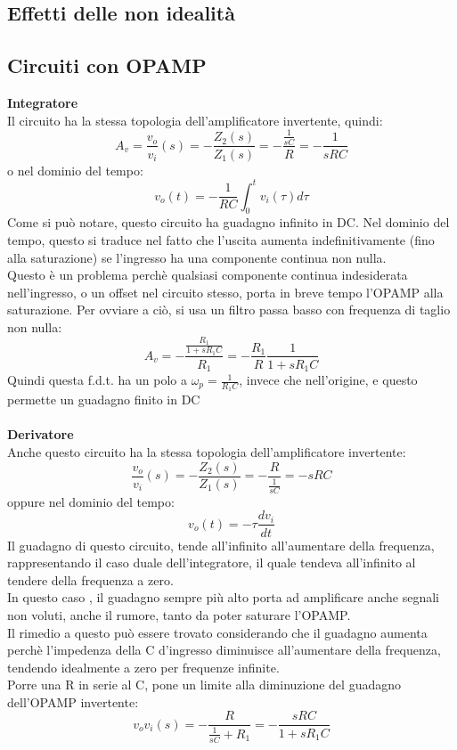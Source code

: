 \documentclass{article}
\begin{document}
\subsection{Effetti delle non idealità}
\subsection{Circuiti con OPAMP}
\textbf{Integratore}\\
Il circuito ha la stessa topologia dell'amplificatore invertente, quindi:
\begin{equation}
    A_{v}=\frac{v_{o}}{v_{i}}(s)=-\frac{Z_{2}(s)}{Z_{1}(s)}=-\frac{\frac{1}{sC}}{R}=-\frac{1}{sRC}
\end{equation}
o nel dominio del tempo:
\begin{equation}
    v_{o}(t)=-\frac{1}{RC}\int_{0}^{t}v_{i}(\tau)d\tau
\end{equation}
Come si può notare, questo circuito ha guadagno infinito in DC. Nel dominio del tempo, questo si traduce nel fatto che l'uscita aumenta indefinitivamente (fino alla saturazione) se l'ingresso ha una componente continua non nulla.\\
Questo è un problema perchè qualsiasi componente continua indesiderata nell'ingresso, o un offset nel circuito stesso, porta in breve tempo l'OPAMP alla saturazione.
Per ovviare a ciò, si usa un filtro passa basso con frequenza di taglio non nulla:
\begin{equation}
A_{v}=-\frac{\frac{R_{1}}{1+sR_{1}C}}{R_{1}}=-\frac{R_{1}}{R}\frac{1}{1+sR_{1}C}
\end{equation}
Quindi questa f.d.t. ha un polo a $\omega_{p}=\frac{1}{R_{1}C}$, invece che nell'origine, e questo permette un guadagno finito in DC \\\\
\textbf{Derivatore}\\
Anche questo circuito ha la stessa topologia dell'amplificatore invertente:
\begin{equation}
    \frac{v_{o}}{v_{i}}(s)=-\frac{Z_{2}(s)}{Z_{1}(s)}=-\frac{R}{\frac{1}{sC}}=-sRC
\end{equation}
oppure nel dominio del tempo:
\begin{equation}
    v_{o}(t)=-\tau\frac{dv_{i}}{dt}
\end{equation}
Il guadagno di questo circuito, tende all'infinito all'aumentare della frequenza, rappresentando il caso duale dell'integratore, il quale tendeva all'infinito al tendere della frequenza a zero.\\
In questo caso , il guadagno sempre più alto porta ad amplificare anche segnali non voluti, anche il rumore, tanto da poter saturare l'OPAMP.\\
Il rimedio a questo può essere trovato considerando che il guadagno aumenta perchè l'impedenza della C d'ingresso diminuisce all'aumentare della frequenza, tendendo idealmente a zero per frequenze infinite.\\
Porre una R in serie al C, pone un limite alla diminuzione del guadagno dell'OPAMP invertente:
\begin{equation}
    {v_{o}}{v_{i}}(s)=-\frac{R}{\frac{1}{sC}+R_{1}}=-\frac{sRC}{1+sR_{1}C}
\end{equation}
\end{document}
